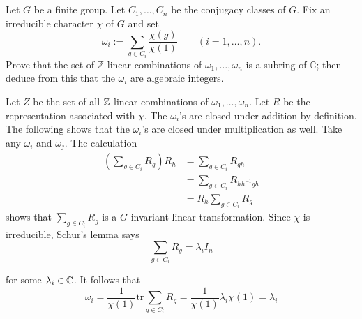 \documentclass[12pt]{article}
\begin{document}
\section{}
 
Let $G$ be a finite group. Let $C_1, \dots, C_n$ be the conjugacy classes of $G$. Fix an irreducible character $\chi$ of $G$ and set
\[
  \omega_i := \sum_{g \in C_i} \frac{\chi(g)}{\chi(1)} \qquad (i = 1, \dots, n).
\]
Prove that the set of $\mathbb{Z}$-linear combinations of $\omega_1, \dots, \omega_n$ is a subring of $\mathbb{C}$;
then deduce from this that the $\omega_i$ are algebraic integers.

\noindent\dotfill 

Let $Z$ be the set of all $\mathbb{Z}$-linear combinations of $\omega_1, \ldots, \omega_n$. 
Let $R$ be the representation associated with $\chi$. 
The $\omega_i$'s are closed under addition by definition. 
The following shows that the $\omega_i$'s are closed under multiplication as well.
Take any $\omega_i$ and $\omega_j$. 
The calculation 
\begin{align*}
  (\sum_{g \in C_i} R_g)R_h & = \sum_{g \in C_i} R_{gh} \\ 
                            & = \sum_{g \in C_i} R_{h h^{-1}gh} \\ 
                            & = R_h \sum_{g \in C_i} R_g 
\end{align*}
shows that $\sum_{g \in C_i} R_g$ is a $G$-invariant linear transformation. 
Since $\chi$ is irreducible, Schur's lemma says 
\begin{equation} \label{eq:7_sumRscalar}
  \sum_{g \in C_i} R_g = \lambda_i I_n
\end{equation}

for some $\lambda_i \in \mathbb{C}$. 
It follows that 
\begin{equation} \label{eq:7_omegaval}
  \omega_i = \frac{1}{\chi(1)} \text{tr} \sum_{g \in C_i} R_g = \frac{1}{\chi(1)}\lambda_i\chi(1) = \lambda_i
\end{equation}
\end{document}
